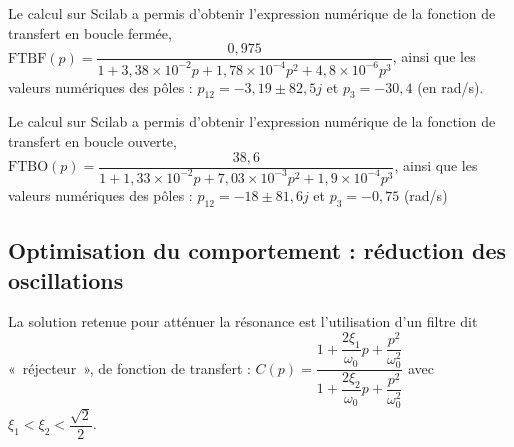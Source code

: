 Le calcul sur Scilab a permis d’obtenir l’expression numérique de la fonction de transfert en
boucle fermée, $\text{FTBF}(p) = \dfrac{0,975}{1+3,38\times 10^{-2}p+1,78\times 10^{-4}p^2+4,8\times 10^{-6}p^3}$, ainsi que les valeurs numériques des pôles : $p_{12}=-3,19 \pm 82,5 j$ et $p_3 = -30,4$ (en rad/s).

\ifprof
\begin{corrige}
\end{corrige}
\else
\fi


\ifprof
\begin{corrige}
\end{corrige}
\else
\fi


\ifprof
\begin{corrige}
\end{corrige}
\else
\fi

Le calcul sur Scilab a permis d’obtenir l’expression numérique de la fonction de transfert en boucle
ouverte, $\text{FTBO}(p) = \dfrac{38,6}{1+1,33\times 10^{-2}p+7,03\times 10^{-3}p^2+1,9\times 10^{-4}p^3}$, ainsi que les valeurs numériques des pôles : $p_{12}=-18 \pm 81,6 j$ et $p_3 = -0,75$ (rad/s)

\ifprof
\begin{corrige}
\end{corrige}
\else
\fi



\subsection*{Optimisation du comportement : réduction des oscillations}
La solution retenue pour atténuer la résonance est l’utilisation d’un filtre dit «~réjecteur~», de
fonction de transfert :
$C(p)=\dfrac{1+\dfrac{2\xi_1}{\omega_0}p+\dfrac{p^2}{\omega_0^2}}{1+\dfrac{2\xi_2}{\omega_0}p+\dfrac{p^2}{\omega_0^2}}$ avec $\xi_1 < \xi_2 < \dfrac{\sqrt{2}}{2}$.

\ifprof
\begin{corrige}
\end{corrige}
\else
\fi

